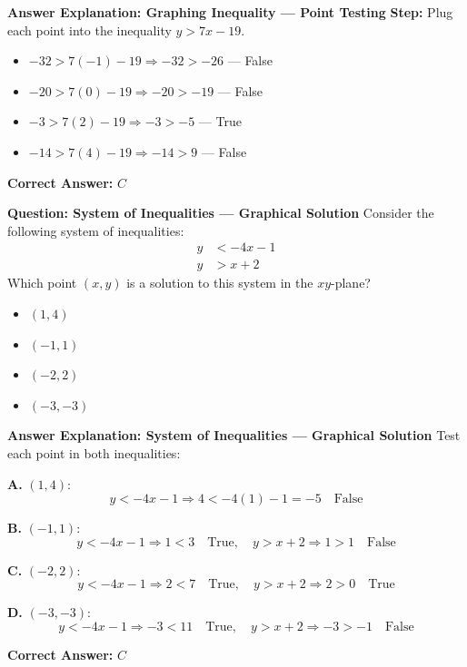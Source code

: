 \documentclass{beamer}
\begin{document}
\begin{frame}{\textbf{Answer Explanation: Graphing Inequality — Point Testing}}
    \textbf{Step:} Plug each point into the inequality \(y > 7x - 19\).

    \begin{itemize}
        \item[\textbf{A.}] \(-32 > 7(-1) - 19 \Rightarrow -32 > -26\) — False
        \item[\textbf{B.}] \(-20 > 7(0) - 19 \Rightarrow -20 > -19\) — False
        \item[\textbf{C.}] \(-3 > 7(2) - 19 \Rightarrow -3 > -5\) — True
        \item[\textbf{D.}] \(-14 > 7(4) - 19 \Rightarrow -14 > 9\) — False
    \end{itemize}

    \textbf{Correct Answer:} \( \boxed{C} \)
\end{frame}

\begin{frame}{\textbf{Question: System of Inequalities — Graphical Solution}}
    Consider the following system of inequalities:
    \[
    \begin{aligned}
    y &< -4x - 1 \\
    y &> x + 2
    \end{aligned}
    \]
    Which point \((x, y)\) is a solution to this system in the \(xy\)-plane?

    \vspace{1em}
    \begin{itemize}
        \item[\textbf{A.}] \((1, 4)\)
        \item[\textbf{B.}] \((-1, 1)\)
        \item[\textbf{C.}] \((-2, 2)\)
        \item[\textbf{D.}] \((-3, -3)\)
    \end{itemize}
\end{frame}

\begin{frame}{\textbf{Answer Explanation: System of Inequalities — Graphical Solution}}
    Test each point in both inequalities:

    \vspace{0.5em}
    \textbf{A.} \((1, 4)\):
    \[
    y < -4x - 1 \Rightarrow 4 < -4(1) - 1 = -5 \quad \text{False}
    \]

    \textbf{B.} \((-1, 1)\):
    \[
    y < -4x - 1 \Rightarrow 1 < 3 \quad \text{True}, \quad y > x + 2 \Rightarrow 1 > 1 \quad \text{False}
    \]

    \textbf{C.} \((-2, 2)\):
    \[
    y < -4x - 1 \Rightarrow 2 < 7 \quad \text{True}, \quad y > x + 2 \Rightarrow 2 > 0 \quad \text{True}
    \]

    \textbf{D.} \((-3, -3)\):
    \[
    y < -4x - 1 \Rightarrow -3 < 11 \quad \text{True}, \quad y > x + 2 \Rightarrow -3 > -1 \quad \text{False}
    \]

    \textbf{Correct Answer:} \( \boxed{C} \)
\end{frame}
\end{document}

